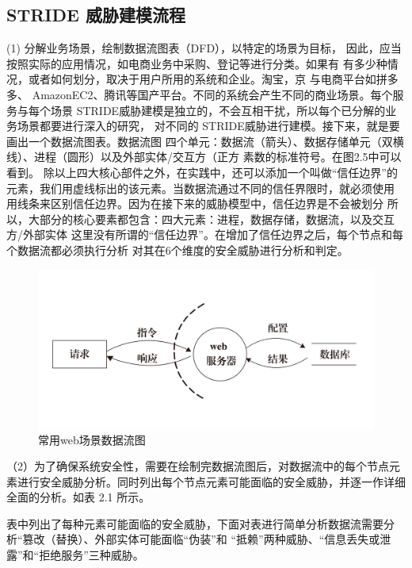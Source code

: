 \subsection{STRIDE 威胁建模流程}
(1) 分解业务场景，绘制数据流图表（DFD），以特定的场景为目标，
因此，应当按照实际的应用情况，如电商业务中采购、登记等进行分类。如果有
有多少种情况，或者如何划分，取决于用户所用的系统和企业。淘宝，京
与电商平台如拼多多、 AmazonEC2、腾讯等国产平台。不同的系统会产生不同的商业场景。每个服务与每个场景
STRIDE威胁建模是独立的，不会互相干扰，所以每个已分解的业务场景都要进行深入的研究，
对不同的 STRIDE威胁进行建模。接下来，就是要画出一个数据流图表。数据流图
四个单元：数据流（箭头）、数据存储单元（双横线）、进程（圆形）以及外部实体/交互方（正方
素数的标准符号。在图2.5中可以看到。
除以上四大核心部件之外，在实践中，还可以添加一个叫做“信任边界”的元素，我们用虚线标出的该元素。当数据流通过不同的信任界限时，就必须使用
用线条来区别信任边界。因为在接下来的威胁模型中，信任边界是不会被划分
所以，大部分的核心要素都包含：四大元素：进程，数据存储，数据流，以及交互方/外部实体
这里没有所谓的“信任边界”。在增加了信任边界之后，每个节点和每个数据流都必须执行分析
对其在6个维度的安全威胁进行分析和判定。

\begin{figure}
    \centering
    \includegraphics[scale=0.4]{resources/img/i7.jpg}
    \caption{常用web场景数据流图}
  \end{figure}
  （2）为了确保系统安全性，需要在绘制完数据流图后，对数据流中的每个节点元素进行安全威胁分析。同时列出每个节点元素可能面临的安全威胁，并逐一作详细全面的分析。如表 2.1 所示。

  表中列出了每种元素可能面临的安全威胁，下面对表进行简单分析数据流需要分析“篡改（替换）、外部实体可能面临“伪装”和
  “抵赖”两种威胁、“信息丢失或泄露”和“拒绝服务”三种威胁。

